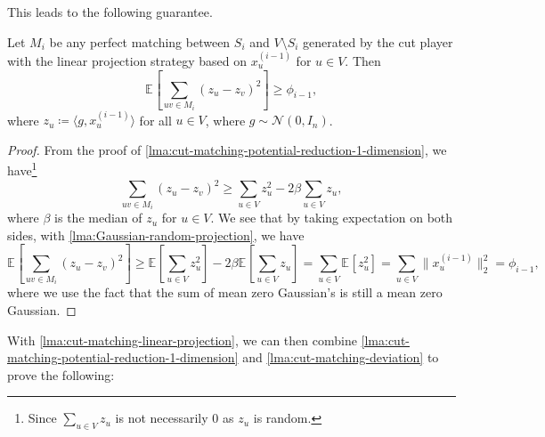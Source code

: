 \begin{center}
\end{center}

This leads to the following guarantee.

\begin{lemma}\label{lma:cut-matching-linear-projection}
	Let \(M_i\) be any perfect matching between \(S_i\) and \(V\setminus S_i\) generated by the cut player with the linear projection strategy based on \(x_u^{(i-1)}\) for \(u \in V\). Then
	\[
		\mathbb{E}_{}\left[\sum_{uv \in M_i} (z_u - z_v)^2 \right]
		\geq \phi _{i-1},
	\]
	where \(z_u \coloneqq \langle g, x_u^{(i-1)} \rangle \) for all \(u \in V\), where \(g \sim \mathcal{N} (0, I_n)\).
\end{lemma}
\begin{proof}
	From the proof of \autoref{lma:cut-matching-potential-reduction-1-dimension}, we have\footnote{Since \(\sum_{u \in V} z_u\) is not necessarily \(0\) as \(z_u\) is random.}
	\[
		\sum_{uv \in M_i} (z_u - z_v)^2
		\geq \sum_{u \in V} z_u^2 - 2 \beta \sum_{u \in V} z_u,
	\]
	where \(\beta \) is the median of \(z_u\) for \(u \in V\). We see that by taking expectation on both sides, with \autoref{lma:Gaussian-random-projection}, we have
	\[
		\mathbb{E}_{}\left[\sum_{uv \in M_i} (z_u - z_v)^2 \right]
		\geq \mathbb{E}_{}\left[\sum_{u \in V} z_u^2 \right] - 2\beta \mathbb{E}_{}\left[\sum_{u \in V} z_u \right]
		= \sum_{u \in V} \mathbb{E}_{}\left[z_u^2 \right]
		= \sum_{u \in V} \lVert x_u^{(i-1)} \rVert _2^2
		= \phi _{i-1},
	\]
	where we use the fact that the sum of mean zero Gaussian's is still a mean zero Gaussian.
\end{proof}

With \autoref{lma:cut-matching-linear-projection}, we can then combine \autoref{lma:cut-matching-potential-reduction-1-dimension} and \autoref{lma:cut-matching-deviation} to prove the following:

